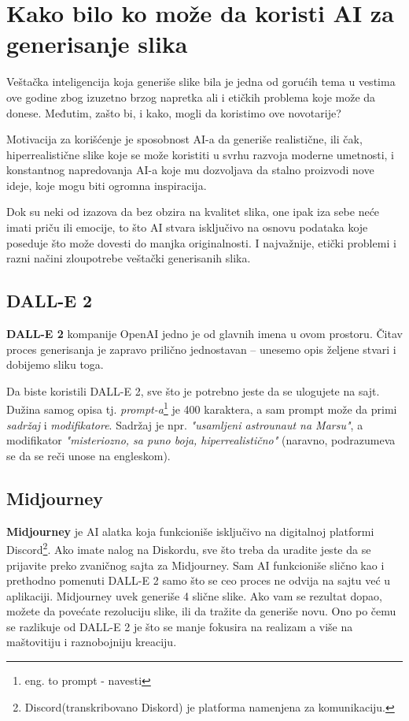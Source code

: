 \documentclass[12pt, letterpaper]{article}
\begin{document}
\section{Kako bilo ko može da koristi AI za generisanje slika}
Veštačka inteligencija koja generiše slike bila je jedna od gorućih tema u vestima ove godine zbog izuzetno brzog napretka ali i etičkih problema koje može da donese. Međutim, zašto bi, i kako, mogli da koristimo ove novotarije?

Motivacija za korišćenje je sposobnost AI-a da generiše realistične, ili čak, hiperrealistične slike koje se može koristiti u svrhu razvoja moderne umetnosti, i konstantnog napredovanja AI-a koje mu dozvoljava da stalno proizvodi nove ideje, koje mogu biti ogromna inspiracija.


Dok su neki od izazova da bez obzira na kvalitet slika, one ipak iza sebe neće imati priču ili emocije, to što AI stvara isključivo na osnovu podataka koje poseduje što može dovesti do manjka originalnosti. I najvažnije, etički problemi  i razni načini zloupotrebe veštački generisanih slika. 

\subsection{DALL-E 2}
\textbf{DALL-E 2} kompanije OpenAI jedno je od glavnih imena u ovom prostoru. Čitav proces generisanja je zapravo prilično jednostavan – unesemo opis željene stvari i dobijemo sliku toga.

Da biste koristili DALL-E 2, sve što je potrebno jeste da se ulogujete na sajt. Dužina samog opisa tj. \textit{prompt-a}\footnote{eng. to prompt - navesti} je 400 karaktera, a sam prompt može da primi \textit{sadržaj} i \textit{modifikatore}. Sadržaj je npr. \textit{"usamljeni astrounaut na Marsu"}, a modifikator \textit{"misteriozno, sa puno boja, hiperrealistično"} (naravno, podrazumeva se da se reči unose na engleskom). 

\subsection{Midjourney}
\textbf{Midjourney} je AI alatka koja funkcioniše isključivo na digitalnoj platformi Discord\footnote{Discord(transkribovano Diskord) je platforma namenjena za komunikaciju.}. Ako imate nalog na Diskordu, sve što treba da uradite jeste da se prijavite preko zvaničnog sajta za Midjourney. Sam  AI funkcioniše slično kao i prethodno pomenuti DALL-E 2 samo što se ceo proces ne odvija na sajtu već u aplikaciji. Midjourney uvek generiše 4 slične slike. Ako vam se rezultat dopao, možete da povećate rezoluciju slike, ili da tražite da generiše novu. Ono po čemu se razlikuje od DALL-E 2 je što se manje fokusira na realizam a više na maštovitiju i raznobojniju kreaciju.
\end{document}
